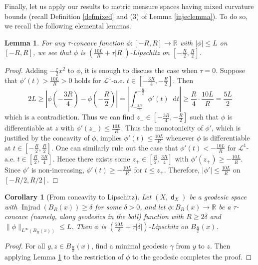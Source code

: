 \documentclass[11pt,reqno]{amsart}
\newtheorem{lemma}[theorem]{Lemma}
\newtheorem{corollary}[theorem]{Corollary}
\theoremstyle{definition}
\numberwithin{equation}{section}
\newcommand{\di}{\mathop{}\!\mathrm{d}}
\DeclareMathOperator{\dist}{\mathsf{d}}
\DeclareMathOperator{\Injrad}{Injrad}
\begin{document}
Finally, let us apply our results to metric measure spaces having mixed curvature bounds (recall Definition \ref{defmixed} and (3) of Lemma \ref{injeclemma}). To do so, we recall the following elemental lemmas.
\begin{lemma}\label{concave}
For any $\tau$-concave function $\phi:[-R, R] \to \mathbb{R}$ with $|\phi| \le L$ on $[-R, R]$, we see that $\phi$ is $\left(\frac{10L}{R}+\tau|R|\right)$-Lipschitz on $[-\frac{R}{2}, \frac{R}{2}]$. 
\end{lemma}
\begin{proof}
Adding $-\frac{\tau}{2} x^2$ to $\phi$, it is enough to discuss the case when $\tau=0$. Suppose that $\phi'(t) > \frac{10L}{R}>0$ holds for $\mathcal{L}^1$-a.e.  $t \in [-\frac{3R}{4}, -\frac{R}{2}]$. Then 
$$
2L \ge \left|\phi\left(-\frac{3R}{4}\right)-\phi\left(-\frac{R}{2}\right)\right|=\left| \int_{-\frac{3R}{4}}^{-\frac{R}{2}}\phi'(t)\di t\right| \ge \frac{R}{4}\cdot \frac{10L}{R} = \frac{5L}{2}
$$
which is a contradiction. Thus we can find $z_- \in [-\frac{3R}{4}, -\frac{R}{2}]$ such that $\phi$ is differentiable at $z$ with $\phi'(z_-) \le \frac{10L}{R}$. Thus the monotonicity of $\phi'$, which is justified by the concavity of $\phi$, implies $\phi'(t) \le \frac{10L}{R}$ whenever $\phi$ is differentiable at $t \in [-\frac{R}{2}, \frac{R}{2}]$.  One can similarly rule out the case that $\phi'(t) < - \frac{10 L}{R}$ for $\mathcal{L}^1$-a.e. $t \in [\frac{R}{2}, \frac{3R}{4}]$. Hence there exists some $z_+ \in [\frac{R}{2}, \frac{3R}{4}]$ with $\phi'(z_+) \geq - \frac{10L}{R}$. Since $\phi'$ is non-increasing, $\phi'(t) \geq -\frac{10L}{R}$ for $t\leq z_+$. Therefore, $|\phi'| \leq \frac{10L}{R}$ on $[-R/2, R/2]$.
\end{proof}
\begin{corollary}[From concavity to Lipschitz]\label{gradient weight} 
Let $(X,\dist_X)$ be a geodesic space with $\Injrad(B_R(x)) \ge \delta$ for some $\delta>0$, and let $\phi:B_R(x) \to \mathbb{R}$ be a $\tau$-concave (namely, along geodesics in the ball) function with $R \ge 2\delta$ and $\|\phi\|_{L^{\infty}(B_R(x))} \le L$. Then  $\phi$ is $\left(\frac{20L}{\delta}+\tau|\delta|\right)$-Lipschitz on $B_{\frac{R}{2}}(x)$.
\end{corollary}
\begin{proof}
For all $y,z \in B_{\frac{R}{2}}(x)$, find a minimal geodesic $\gamma$ from $y$ to $z$. Then applying Lemma \ref{concave} to the restriction of $\phi$ to the geodesic completes the proof. 
\end{proof}
\end{document}
